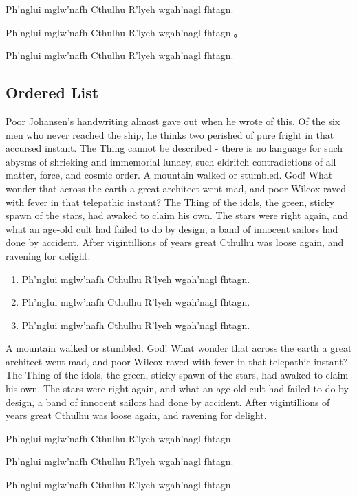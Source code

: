 \begin{itemize*}
  \item Ph'nglui mglw'nafh Cthulhu R'lyeh wgah'nagl fhtagn.
  \item Ph'nglui mglw'nafh Cthulhu R'lyeh wgah'nagl fhtagn.。
  \item Ph'nglui mglw'nafh Cthulhu R'lyeh wgah'nagl fhtagn.
\end{itemize*}

\subsection{Ordered List}
\label{sec:orderlist}

Poor Johansen's handwriting almost gave out when he wrote of this. Of the six men who never reached the ship, he thinks two perished of pure fright in that accursed instant. The Thing cannot be described - there is no language for such abysms of shrieking and immemorial lunacy, such eldritch contradictions of all matter, force, and cosmic order. A mountain walked or stumbled. God! What wonder that across the earth a great architect went mad, and poor Wilcox raved with fever in that telepathic instant? The Thing of the idols, the green, sticky spawn of the stars, had awaked to claim his own. The stars were right again, and what an age-old cult had failed to do by design, a band of innocent sailors had done by accident. After vigintillions of years great Cthulhu was loose again, and ravening for delight. 

\begin{enumerate}
  \item Ph'nglui mglw'nafh Cthulhu R'lyeh wgah'nagl fhtagn.
  \item Ph'nglui mglw'nafh Cthulhu R'lyeh wgah'nagl fhtagn.
  \item Ph'nglui mglw'nafh Cthulhu R'lyeh wgah'nagl fhtagn.
\end{enumerate}

 A mountain walked or stumbled. God! What wonder that across the earth a great architect went mad, and poor Wilcox raved with fever in that telepathic instant? The Thing of the idols, the green, sticky spawn of the stars, had awaked to claim his own. The stars were right again, and what an age-old cult had failed to do by design, a band of innocent sailors had done by accident. After vigintillions of years great Cthulhu was loose again, and ravening for delight. 

\begin{enumerate*}
  \item Ph'nglui mglw'nafh Cthulhu R'lyeh wgah'nagl fhtagn.
  \item Ph'nglui mglw'nafh Cthulhu R'lyeh wgah'nagl fhtagn.
  \item Ph'nglui mglw'nafh Cthulhu R'lyeh wgah'nagl fhtagn.
\end{enumerate*}

